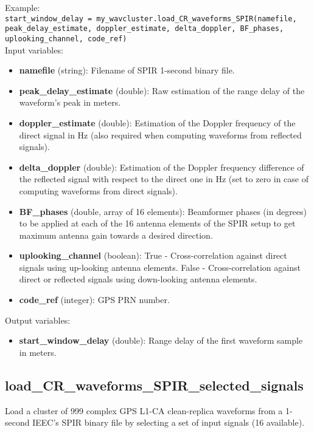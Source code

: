 Example:\\

\texttt{start\_window\_delay = my\_wavcluster.load\_CR\_waveforms\_SPIR(namefile, peak\_delay\_estimate, doppler\_estimate, delta\_doppler, BF\_phases, uplooking\_channel, code\_ref)}\\

Input variables:
\begin{itemize}
\item {\bf namefile} (string): Filename of SPIR 1-second binary file.
\item {\bf peak\_delay\_estimate} (double): Raw estimation of the range delay of the waveform's peak in meters.
\item {\bf doppler\_estimate} (double): Estimation of the Doppler frequency of the direct signal in Hz (also required when computing waveforms from reflected signals).
\item {\bf delta\_doppler} (double): Estimation of the Doppler frequency difference of the reflected signal with respect to the direct one in Hz (set to zero in case of computing waveforms from direct signals).
\item {\bf BF\_phases} (double, array of 16 elements): Beamformer phases (in degrees) to be applied at each of the 16 antenna elements of the SPIR setup to get maximum antenna gain towards a desired direction.
\item {\bf uplooking\_channel} (boolean): True - Cross-correlation against direct signals using up-looking antenna elements. False - Cross-correlation against direct or reflected signals using down-looking antenna elements.
\item {\bf code\_ref} (integer): GPS PRN number. 
\end{itemize}

Output variables:
\begin{itemize}
\item {\bf start\_window\_delay} (double): Range delay of the first waveform sample in meters.
\end{itemize}


\subsection{load\_CR\_waveforms\_SPIR\_selected\_signals}

Load a cluster of 999 complex GPS L1-CA clean-replica waveforms from a 1-second IEEC's SPIR binary file by selecting a set of input signals (16 available).\\

